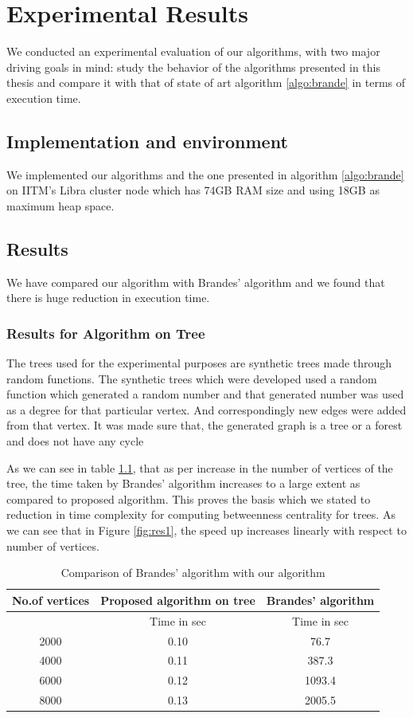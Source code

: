\chapter{Experimental Results}
\label{chap:results}

We conducted an experimental evaluation of our algorithms, with two major driving goals in mind: study the behavior of the algorithms presented in this thesis and compare it with that of state of art algorithm \ref{algo:brande} in terms of execution time.

\section{Implementation and environment}
We implemented our algorithms and the one presented in algorithm \ref{algo:brande} on IITM's Libra cluster node which has 74GB RAM size and using 18GB as maximum heap space. 

\vspace{-1.5em}
\section{Results}
We have compared our algorithm with Brandes' algorithm and we found that there is huge reduction in execution time.
\vspace{-1.0em}
\subsection{Results for Algorithm on Tree}
The trees used for the experimental purposes are synthetic trees made through random functions.
The synthetic trees which were developed used a random function which generated a random number and that generated number was used as a degree for that particular vertex. And correspondingly new edges were added from that vertex. It was made sure that, the generated graph is a tree or a forest and does not have any cycle

As we can see in table \ref{tab:res1}, that as per increase in the number of vertices of the tree, the time taken by Brandes' algorithm increases to a large extent as compared to proposed algorithm. This proves the basis which we stated to reduction in  time complexity for computing betweenness centrality for trees. As we can see that in Figure \ref{fig:res1}, the speed up increases linearly with respect to number of vertices.

\begin{table}[h!]
\centering
\begin{tabular}{|c|c|c|}
\hline
No.of vertices & Proposed algorithm on tree & Brandes' algorithm \\
\hline
 & Time in sec & Time in sec\\ 
\hline
2000 & 0.10 & 76.7 \\ 
\hline
4000 & 0.11 & 387.3 \\ 
\hline
6000 & 0.12 & 1093.4 \\ 
\hline
8000 & 0.13 & 2005.5 \\ 
\hline
\end{tabular}
\caption{Comparison of Brandes' algorithm with our algorithm}
\label{tab:res1}
\end{table}




